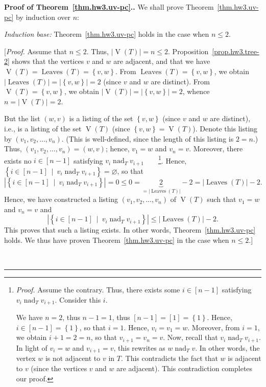 \documentclass[numbers=enddot,12pt,final,onecolumn,notitlepage]{scrartcl}%
\theoremstyle{definition}
\newenvironment{proof}[1][Proof]{\noindent\textbf{#1.} }{\ \rule{0.5em}{0.5em}}
\newcommand{\set}[1]{\left\{ #1 \right\}}
\newcommand{\abs}[1]{\left| #1 \right|}
\newcommand{\tup}[1]{\left( #1 \right)}
\newcommand{\ive}[1]{\left[ #1 \right]}
\newcommand{\verts}[1]{\operatorname{V}\left( #1 \right)}
\newcommand{\leaves}[1]{\operatorname{Leaves}\left( #1 \right)}
\begin{document}
\begin{proof}[Proof of Theorem~\ref{thm.hw3.uv-pc}.]
We shall prove Theorem~\ref{thm.hw3.uv-pc} by induction over $n$:

\textit{Induction base:} Theorem~\ref{thm.hw3.uv-pc} holds in
the case when $n \leq 2$.

  [\textit{Proof.}
  Assume that $n \leq 2$.
  Thus, $\abs{\verts{T}} = n \leq 2$.
  Proposition~\ref{prop.hw3.tree-2} shows that the vertices $v$ and
  $w$ are adjacent, and that we have
  $\verts{T} = \leaves{T} = \set{v, w}$.
  From $\leaves{T} = \set{v, w}$, we obtain
  $\abs{\leaves{T}} = \abs{\set{v, w}} = 2$ (since $v$ and $w$ are
  distinct).
  From $\verts{T} = \set{v, w}$, we obtain
  $\abs{\verts{T}} = \abs{\set{v, w}} = 2$, whence
  $n = \abs{\verts{T}} = 2$.
  \par
  But the list $\tup{w, v}$ is a listing of the set $\set{v, w}$
  (since $v$ and $w$ are distinct), i.e., is a listing of the set
  $\verts{T}$ (since $\set{v, w} = \verts{T}$).
  Denote this listing by $\tup{v_1, v_2, \ldots, v_n}$.
  (This is well-defined, since the length of this listing is $2 = n$.)
  Thus, $\tup{v_1, v_2, \ldots, v_n} = \tup{w, v}$; hence,
  $v_1 = w$ and $v_n = v$.
  Moreover, there exists no $i \in \ive{n-1}$ satisfying
  $v_i \operatorname{nad}_T v_{i+1}$\ \ \ \ \footnote{\textit{Proof.}
    Assume the contrary.
    Thus, there exists some $i \in \ive{n-1}$ satisfying
    $v_i \operatorname{nad}_T v_{i+1}$.
    Consider this $i$.
    \par
    We have $n = 2$, thus $n-1 = 1$, thus
    $\ive{n-1} = \ive{1} = \set{1}$.
    Hence, $i \in \ive{n-1} = \set{1}$, so that $i = 1$.
    Hence, $v_i = v_1 = w$.
    Moreover, from $i = 1$, we obtain $i+1 = 2 = n$, so that
    $v_{i+1} = v_n = v$.
    Now, recall that $v_i \operatorname{nad}_T v_{i+1}$.
    In light of $v_i = w$ and $v_{i+1} = v$, this rewrites as
    $w \operatorname{nad}_T v$.
    In other words, the vertex $w$ is not adjacent to $v$ in $T$.
    This contradicts the fact that $w$ is adjacent to $v$ (since the
    vertices $v$ and $w$ are adjacent).
    This contradiction completes our proof.}.
  Hence,
  $\set{i \in \ive{n-1} \ \mid \ v_i \operatorname{nad}_T v_{i+1} }
  = \varnothing$, so that
  \[
  \abs{\set{i \in \ive{n-1} \ \mid \ v_i \operatorname{nad}_T v_{i+1} }}
  = 0 \leq 0
  = \underbrace{2}_{= \abs{\leaves{T}}} - 2
  = \abs{\leaves{T}} - 2.
  \]
  Hence, we have constructed a listing $\tup{v_1, v_2, \ldots, v_n}$
  of $\verts{T}$ such that $v_1 = w$ and $v_n = v$ and
  \[
  \abs{\set{i \in \ive{n-1} \ \mid \ v_i \operatorname{nad}_T v_{i+1} }}
  \leq \abs{\leaves{T}} - 2.
  \]
  This proves that such a listing exists.
  In other words, Theorem~\ref{thm.hw3.uv-pc} holds.
  We thus have proven Theorem~\ref{thm.hw3.uv-pc} in the case when
  $n \leq 2$.]


\end{proof}
\end{document}
